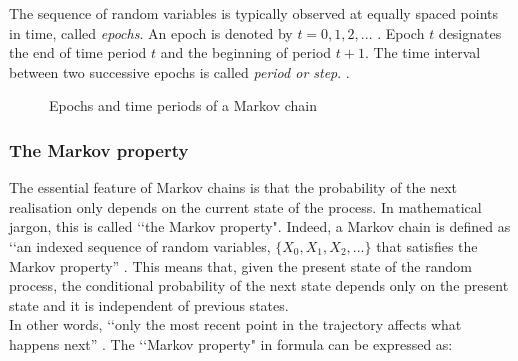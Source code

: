 \documentclass[\main/main.tex]{subfiles}
\begin{document}
The sequence of random variables is typically observed at equally spaced points in time, called 
\textit{epochs}. An epoch is denoted by $t = 0, 1, 2, ...$ . Epoch $t$ designates the end of time period $t$ and the beginning of period $t + 1$. The time interval between two successive epochs is called \textit{period or step}. \citep{Sheskin2010}.\\


\begin{figure}[H]
\centering
{}
\caption{Epochs and time periods of a Markov chain}
\label{fig:markov_chain}
\end{figure}






\subsubsection{The Markov property}

The essential feature of Markov chains is that the probability of the next realisation only depends on the current state of the process. In mathematical jargon, this is called \lq\lq the Markov property". Indeed, a Markov chain is defined as \lq\lq an indexed sequence of random variables, $\{X_0, X_1, X_2, ...\}$ that satisfies the Markov property'' \citep{Sheskin2010}. This means that, given the present state of the random process, the conditional probability of the next state depends only on the present state and it is independent of previous states.\\
In other words, \lq\lq only the most recent point in the trajectory affects what happens next'' \citep{Holmes2015}.
The \lq\lq Markov property" in formula can be expressed as:
\end{document}
